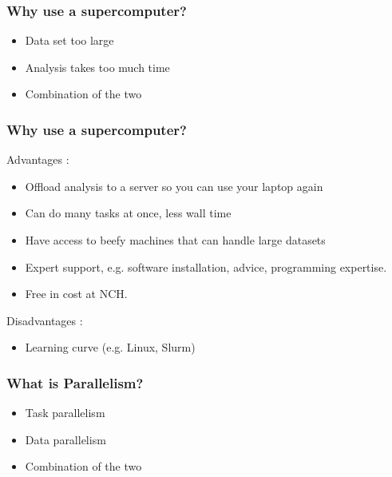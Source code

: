 \documentclass{beamer}
\begin{document}
\begin{frame}
\frametitle{Why use a supercomputer?}
\begin{itemize}
    \item Data set too large
    \bigskip
    \pause
    \item Analysis takes too much time
    \bigskip
    \pause
    \item Combination of the two
\end{itemize}
\end{frame}


\begin{frame}
\frametitle{Why use a supercomputer?}
Advantages :
\begin{itemize}
    \pause
    \item Offload analysis to a server so you can use your laptop again
    \bigskip
    \pause
    \item Can do many tasks at once, less wall time
    \bigskip
    \pause
    \item Have access to beefy machines that can handle large datasets
    \bigskip
    \pause
    \item Expert support, e.g. software installation, advice, programming expertise.
    \bigskip
    \pause
    \item Free in cost at NCH.
    \pause
\end{itemize}
Disadvantages :
\begin{itemize}
    \pause
    \item Learning curve (e.g. Linux, Slurm)
\end{itemize}
\end{frame}


\begin{frame}
\frametitle{What is Parallelism?}
\begin{itemize}
    \item Task parallelism
    \bigskip
    \pause
    \item Data parallelism
    \bigskip
    \pause
    \item Combination of the two
\end{itemize}
\end{frame}


\end{document}
